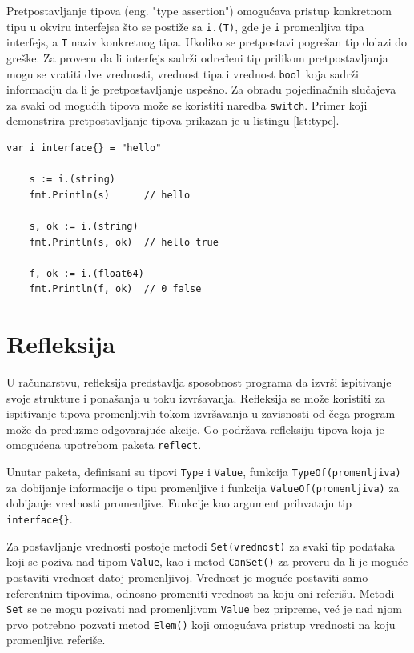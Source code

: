 \documentclass[12pt,oneside]{memoir}
\begin{document}
Pretpostavljanje tipova (eng. "type assertion") omogućava pristup konkretnom tipu u okviru interfejsa što se postiže sa \texttt{i.(T)}, gde je \texttt{i} promenljiva tipa interfejs, a \texttt{T} naziv konkretnog tipa. Ukoliko se pretpostavi pogrešan tip dolazi do greške.  Za proveru da li interfejs sadrži određeni tip prilikom pretpostavljanja mogu se vratiti dve vrednosti, vrednost tipa i vrednost \texttt{bool} koja sadrži informaciju da li je pretpostavljanje uspešno. Za obradu pojedinačnih slučajeva za svaki od mogućih tipova može se koristiti naredba \texttt{switch}.  Primer koji demonstrira pretpostavljanje tipova prikazan je u listingu \ref{lst:type}.

\begin{center}
\begin{lstlisting}[caption=Primer koji demonstrira pretpostavljanje tipova kod interfejsa, label={lst:type},  backgroundcolor=\color{background}]
	var i interface{} = "hello"

	s := i.(string)
	fmt.Println(s) 		// hello

	s, ok := i.(string)
	fmt.Println(s, ok) 	// hello true

	f, ok := i.(float64)
	fmt.Println(f, ok) 	// 0 false
\end{lstlisting}
\end{center}


\section{Refleksija}

U računarstvu, refleksija predstavlja sposobnost programa da izvrši ispitivanje svoje strukture i ponašanja u toku izvršavanja. Refleksija se može koristiti za ispitivanje tipova promenljivih tokom izvršavanja u zavisnosti od čega program može da preduzme odgovarajuće akcije. Go podržava refleksiju tipova koja je omogućena upotrebom paketa \texttt{reflect}.

Unutar paketa, definisani su tipovi \texttt{Type} i \texttt{Value}, funkcija \texttt{TypeOf(promenljiva)} za dobijanje informacije o tipu promenljive i funkcija \texttt{ValueOf(promenljiva)} za dobijanje vrednosti promenljive. Funkcije kao argument prihvataju tip \texttt{interface\{\}}. 

Za postavljanje vrednosti postoje metodi \texttt{Set(vrednost)} za svaki tip podataka koji se poziva nad tipom \texttt{Value}, kao i metod \texttt{CanSet()} za proveru da li je moguće postaviti vrednost datoj promenljivoj. Vrednost je moguće postaviti samo referentnim tipovima, odnosno promeniti vrednost na koju oni referišu. Metodi \texttt{Set} se ne mogu pozivati nad promenljivom \texttt{Value} bez pripreme, već je nad njom prvo potrebno pozvati metod \texttt{Elem()} koji omogućava pristup vrednosti na koju promenljiva referiše.  
\end{document}
